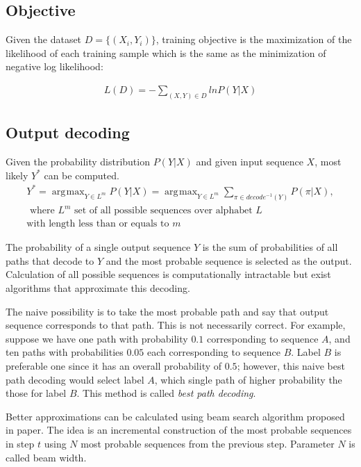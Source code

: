 \documentclass[times, utf8, diplomski, numeric, english]{fer}
\DeclareMathOperator*{\argmax}{\arg\!\max}
\begin{document}
\subsection{Objective}
Given the dataset $D = \{(X_i, Y_i)\}$, training objective is the maximization of the likelihood of each training sample  which is the same as the minimization of negative log likelihood:

\begin{equation}
\begin{gathered}
L(D) = - \sum_{(X,Y)\in D}^{} ln P(Y | X)
\end{gathered}
\end{equation}


\subsection{Output decoding}
Given the probability distribution $P(Y | X)$ and given input sequence $X$, most likely $Y^{*}$ can be computed.
\begin{equation}
\begin{gathered}
Y^{*} = \argmax_{Y \in L^m} P(Y|X) = \argmax_{Y \in L^m} \sum_{\pi \in decode^{-1}(Y)}^{} P(\pi | X),\\
\text{~where $L^m$ set of all possible sequences over alphabet $L$ }\\
\text{with length less than or equals to $m$}
\end{gathered}
\end{equation}

The probability of a single output sequence $Y$ is the sum of probabilities of all paths that decode to $Y$ and the most probable sequence is selected as the output.
Calculation of all possible sequences is computationally intractable but exist algorithms that approximate this decoding. 

The naive possibility is to take the most probable path and say that output sequence corresponds to that path.
This is not necessarily correct.  For example, suppose we have one path with probability $0.1$ corresponding to sequence $A$, and ten paths with probabilities  $0.05$ each corresponding to sequence $B$. Label $B$ is preferable one since it has an overall probability of $0.5$; however, this naive best path decoding would select label $A$, which single path of higher probability the those for label $B$. This method is called \textit{best path decoding}.

Better approximations can be calculated using beam search algorithm proposed in paper\cite{graves_decode}.  
The idea is an incremental construction of the most probable sequences in step $t$ using $N$ most probable sequences from the previous step. Parameter $N$ is called beam width. 
\end{document}
